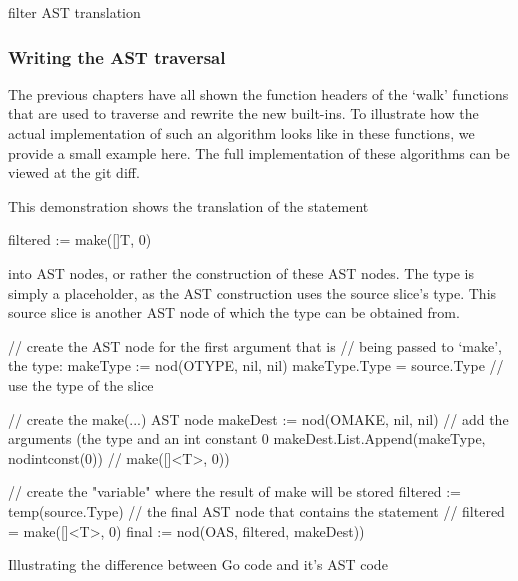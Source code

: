 \begin{code}
	\caption{filter AST translation\autocite{filter-walk-implementation}}
\end{code}

\subsubsection{Writing the AST traversal}\label{ch:ast-traversal}

The previous chapters have all shown the function headers of the `walk' functions
that are used to traverse and rewrite the new built-ins. To illustrate how the
actual implementation of such an algorithm looks like in these functions, we
provide a small example here. The full implementation of these algorithms can
be viewed at the git diff\autocite{ba-go1-14-thesis-diff}.

This demonstration shows the translation of the statement
\begin{gocode}
filtered := make([]T, 0)
\end{gocode}
into AST nodes, or rather the construction of these AST nodes.
The type is simply a placeholder, as the AST construction uses the source slice's
type. This source slice is another AST node of which the type can be obtained from.

\begin{code}
	\begin{gocode}
// create the AST node for the first argument that is
// being passed to `make', the type:
makeType := nod(OTYPE, nil, nil)
makeType.Type = source.Type // use the type of the slice

// create the make(...) AST node
makeDest := nod(OMAKE, nil, nil)
// add the arguments (the type and an int constant 0
makeDest.List.Append(makeType, nodintconst(0)) // make([]<T>, 0))

// create the "variable" where the result of make will be stored
filtered := temp(source.Type)
// the final AST node that contains the statement
//   filtered = make([]<T>, 0)
final := nod(OAS, filtered, makeDest))
\end{gocode}
	\caption{Illustrating the difference between Go code and it's AST code}
\end{code}
